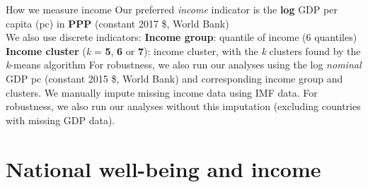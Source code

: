 \documentclass[aspectratio=169,xcolor=dvipsnames, 11pt,mathserif]{beamer}
\begin{document}
\begin{frame}{How we measure income}    
    \bbvsp %
    \ip Our preferred \textit{income} indicator is the \textbf{log} GDP per capita (pc) in \textbf{PPP} (constant 2017 \$, World Bank) \pause \\ We also use discrete indicators: \pause \bbvsp
    \ip \textbf{Income group}: quantile of income (6 quantiles)
    \ip \textbf{Income cluster} (\textit{k} = \textbf{5}, \textbf{6} or \textbf{7}): income cluster, with the \textit{k} clusters found by the \textit{k}-means algorithm
    \ee
    \ip For robustness, we also run our analyses using the log \textit{nominal} GDP pc (constant 2015 \$, World Bank) and corresponding income group and clusters.
    \ip We manually impute missing income data using IMF data.
    \bbvsp \ip For robustness, we also run our analyses without this imputation (excluding countries with missing GDP data).
    \ee
    \ee 
\end{frame}

\section{National well-being and income}
\end{document}
